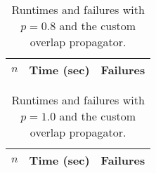 \documentclass[a4paper,11pt]{article}
\begin{document}
\begin{table}[h]
\centering
\begin{tabular}{r|r|r}
$n$ & Time (sec) & Failures \\
\hline   
\end{tabular}
\caption{Runtimes and failures with $p = 0.8$ and the custom overlap propagator.} 
\end{table}

\begin{table}[h]
\centering
\begin{tabular}{r|r|r}
$n$ & Time (sec) & Failures \\
\hline   
\end{tabular}
\caption{Runtimes and failures with $p = 1.0$ and the custom overlap propagator.} 
\end{table}
\end{document}
